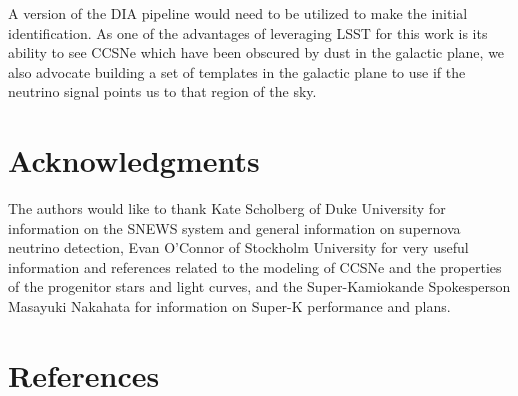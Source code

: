 \documentclass[11pt, letterpaper]{article}
\begin{document}
A version of the DIA pipeline would need to be utilized to make the
initial identification.  As one of the advantages of leveraging LSST
for this work is its ability to see CCSNe which have been obscured by
dust in the galactic plane, we also advocate building a set of
templates in the galactic plane to use if the neutrino signal points
us to that region of the sky.

\section{Acknowledgments}

The authors would like to thank Kate Scholberg of Duke University for
information on the SNEWS system and general information on supernova
neutrino detection, Evan O'Connor of Stockholm University for
very useful information and references related to the modeling of CCSNe
and the properties of the progenitor stars and light curves, and the
Super-Kamiokande Spokesperson Masayuki Nakahata for information on
Super-K performance and plans.

\section{References}

 

\end{document}
